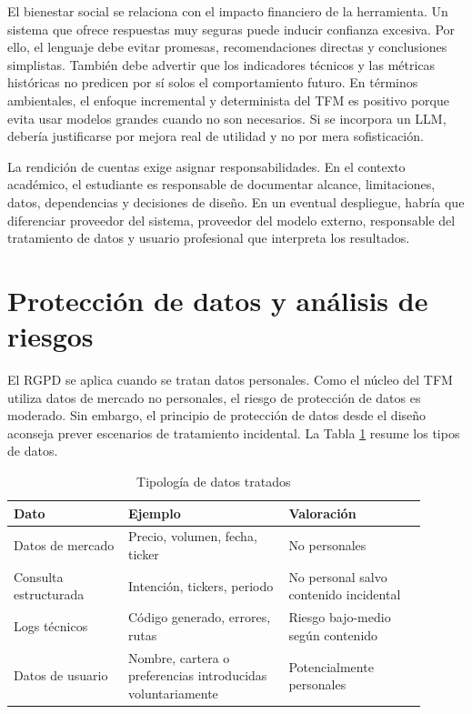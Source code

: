 \documentclass{article}
\begin{document}
El bienestar social se relaciona con el impacto financiero de la herramienta. Un sistema que ofrece respuestas muy seguras puede inducir confianza excesiva. Por ello, el lenguaje debe evitar promesas, recomendaciones directas y conclusiones simplistas. También debe advertir que los indicadores técnicos y las métricas históricas no predicen por sí solos el comportamiento futuro. En términos ambientales, el enfoque incremental y determinista del TFM es positivo porque evita usar modelos grandes cuando no son necesarios. Si se incorpora un LLM, debería justificarse por mejora real de utilidad y no por mera sofisticación.

La rendición de cuentas exige asignar responsabilidades. En el contexto académico, el estudiante es responsable de documentar alcance, limitaciones, datos, dependencias y decisiones de diseño. En un eventual despliegue, habría que diferenciar proveedor del sistema, proveedor del modelo externo, responsable del tratamiento de datos y usuario profesional que interpreta los resultados.

\section{Protección de datos y análisis de riesgos}

El RGPD se aplica cuando se tratan datos personales. Como el núcleo del TFM utiliza datos de mercado no personales, el riesgo de protección de datos es moderado. Sin embargo, el principio de protección de datos desde el diseño aconseja prever escenarios de tratamiento incidental. La Tabla \ref{tab:datos} resume los tipos de datos.

\begin{table}[h]
\centering
\caption{Tipología de datos tratados}
\label{tab:datos}
\small
\begin{tabular}{p{0.25\linewidth}p{0.35\linewidth}p{0.30\linewidth}}
\toprule
\textbf{Dato} & \textbf{Ejemplo} & \textbf{Valoración} \\
\midrule
Datos de mercado & Precio, volumen, fecha, ticker & No personales \\
Consulta estructurada & Intención, tickers, periodo & No personal salvo contenido incidental \\
Logs técnicos & Código generado, errores, rutas & Riesgo bajo-medio según contenido \\
Datos de usuario & Nombre, cartera o preferencias introducidas voluntariamente & Potencialmente personales \\
\bottomrule
\end{tabular}
\end{table}
\end{document}
